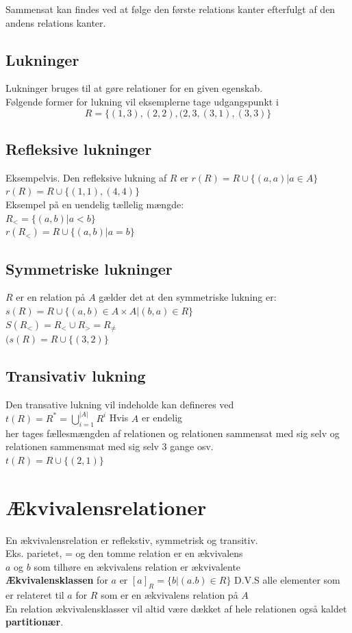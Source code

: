 \documentclass[12pt, a4paper]{article}
\begin{document}
				\begin{center}
					Sammensat kan findes ved at følge den første relations kanter efterfulgt af den andens relations kanter.
				\end{center}
			\subsection{Lukninger }
				Lukninger bruges til at gøre relationer for en given egenskab.\\
				Følgende former for lukning vil eksemplerne tage udgangspunkt i $$R=\{(1,3),(2,2),(2,3,(3,1),(3,3)\}$$

				\subsection{Refleksive lukninger}
					Eksempelvis. Den refleksive lukning af $R$ er $r(R)=R\cup \{(a,a)|a\in A\}$\\
					$r(R)=R\cup \{(1,1),(4,4)\}$\\
					Eksempel på en uendelig tællelig mængde:\\
					$R_<=\{(a,b)|a<b\}$\\
					$r(R_<)=R\cup \{(a,b)|a=b\}$
				\subsection{Symmetriske lukninger}
					$R$ er en relation på $A$ gælder det at den symmetriske lukning er:\\
					$s(R)=R\cup\{(a,b)\in A\times A|(b,a)\in R\}$\\
					$S(R_<)=R_< \cup R_> = R_{\neq}$\\
					$(s(R)=R\cup \{(3,2)\}$
				\subsection{Transivativ lukning}
					Den transative lukning vil indeholde kan defineres ved \\
					$t(R)=R^*=\bigcup\limits_{i=1}^{|A|} R^i$ Hvis $A$ er endelig\\
					her tages fællesmængden af relationen og relationen sammensat med sig selv og relationen sammensmat med sig selv 3 gange osv.\\
					$t(R)=R\cup \{(2,1)\}$
			\section{Ækvivalensrelationer}
				En ækvivalensrelation er reflekstiv, symmetrisk og transitiv.\\
				Eks. parietet, = og den tomme relation er en ækvivalens\\
				$a$ og $b$ som tilhøre en ækvivalens relation er ækvivalente\\
				\textbf{Ækvivalensklassen} for $a$ er $[a]_R=\{b|(a.b)\in R\}$ D.V.S alle elementer som er relateret til $a$ for $R$ som er en ækvivalens relation på $A$\\ 
				En relation ækvivalensklasser vil altid være dækket af hele relationen også kaldet \textbf{partitionær}.\\
\end{document}
